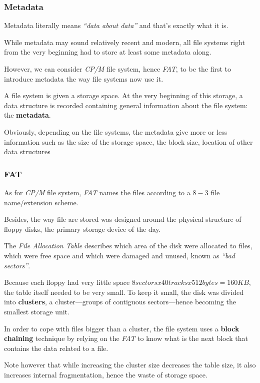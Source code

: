 \begin{frame}
  \frametitle{Metadata}

  Metadata literally means \textit{``data about data''} and that's exactly
  what it is.

  \-

  While metadata may sound relatively recent and modern, all file systems
  right from the very beginning had to store at least some metadata along.

  \-

  However, we can consider \textit{CP/M} file system, hence \textit{FAT},
  to be the first to introduce metadata the way file systems now use it.

  \-

  A file system is given a storage space. At the very beginning of this
  storage, a data structure is recorded containing general information
  about the file system: the \textbf{metadata}.

  \-

  Obviously, depending on the file systems, the metadata give more or less
  information such as the size of the storage space, the block size,
  location of other data structures \etc{}
\end{frame}


\begin{frame}
  \frametitle{FAT}

  As for \textit{CP/M} file system, \textit{FAT} names the files according
  to a $8-3$ file name/extension scheme.

  \-

  Besides, the way file are stored was designed around the physical structure
  of floppy disks, the primary storage device of the day.

  \-

  The \textit{File Allocation Table} describes which area of the disk were
  allocated to files, which were free space and which were damaged and
  unused, known as \textit{``bad sectors''}.

  \-

  Because each floppy had very little space \ie{} $8 sectors x 40 tracks x
  512 bytes = 160 KB$, the table itself needed to be very small. To keep it
  small, the disk was divided into \textbf{clusters}, a cluster---groups
  of contiguous sectors---hence becoming the smallest storage unit.

  \-

  In order to cope with files bigger than a cluster, the file system uses
  a \textbf{block chaining} technique by relying on the \textit{FAT} to
  know what is the next block that contains the data related to a file.

  \-

  Note however that while increasing the cluster size decreases the table
  size, it also increases internal fragmentation, hence the waste of
  storage space.
\end{frame}

